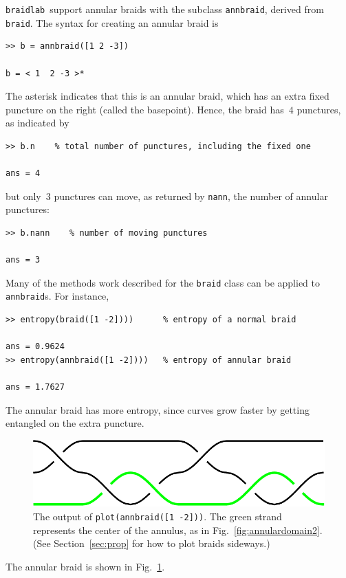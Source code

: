 \documentclass[12pt]{article}
\newcommand{\braidlab}{\texttt{braidlab}}%
\newcommand{\braid}{\texttt{braid}}%
\newcommand{\annbraid}{\texttt{annbraid}}%
\begin{document}
\braidlab\ support annular braids with the subclass \annbraid, derived from
\braid.  The syntax for creating an annular braid is
\begin{lstlisting}[frame=single,framerule=0pt]
>> b = annbraid([1 2 -3])

b = < 1  2 -3 >*
\end{lstlisting}
The asterisk indicates that this is an annular braid, which has an extra fixed
puncture on the right (called the basepoint).  Hence, the braid has~$4$
punctures, as indicated by
\begin{lstlisting}[frame=single,framerule=0pt]
>> b.n    % total number of punctures, including the fixed one

ans = 4
\end{lstlisting}
but only~$3$ punctures can move, as returned by \lstinline{nann}, the number
of annular punctures:
\begin{lstlisting}[frame=single,framerule=0pt]
>> b.nann    % number of moving punctures

ans = 3
\end{lstlisting}

Many of the methods work described for the \lstinline{braid} class can be
applied to \annbraid{}s.  For instance,
\begin{lstlisting}[frame=single,framerule=0pt]
>> entropy(braid([1 -2])))      % entropy of a normal braid

ans = 0.9624
>> entropy(annbraid([1 -2])))   % entropy of annular braid

ans = 1.7627
\end{lstlisting}
The annular braid has more entropy, since curves grow faster by getting
entangled on the extra puncture.
%
\begin{figure}
  \begin{center}
    \includegraphics[width=.7\textwidth]{annbraid_s1s-2}
  \end{center}
  \caption{The output of \lstinline{plot(annbraid([1 -2]))}.  The green strand
    represents the center of the annulus, as in
    Fig.~\ref{fig:annulardomain2}. (See Section~\ref{sec:prop} for how to plot
    braids sideways.)}
  \label{fig:annbraid_s1s-2}
\end{figure}
%
The annular braid is shown in Fig.~\ref{fig:annbraid_s1s-2}.
\end{document}
